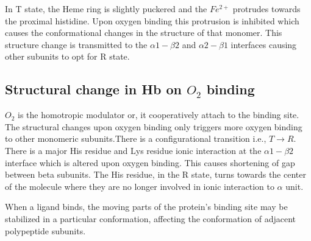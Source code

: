 \documentclass[12pt]{article}
\begin{document}
In T state, the Heme ring is slightly puckered and the $Fe^{2+}$ protrudes towards the proximal histidine. Upon oxygen binding this protrusion is inhibited which causes the conformational changes in the structure of that monomer. This structure change is transmitted to the $\alpha1-\beta2$ and $\alpha2-\beta1$ interfaces causing other subunits to opt for R state.
\subsection{Structural change in Hb on $O_{2}$ binding}
$O_{2}$ is the homotropic modulator or, it cooperatively attach to the binding site. The structural changes upon oxygen binding only triggers more oxygen binding to other monomeric subunits.There is a configurational transition i.e., $T\rightarrow R$. There is a major His residue and Lys residue ionic interaction at the $\alpha1-\beta2$ interface which is altered upon oxygen binding. This causes shortening of gap between beta subunits. The His residue, in the R state, turns towards the center of the molecule where they are no longer involved in ionic interaction to $\alpha$ unit.

When a ligand binds, the moving parts of the protein’s binding site may be stabilized in a particular conformation, affecting the conformation of adjacent polypeptide subunits.
\end{document}
